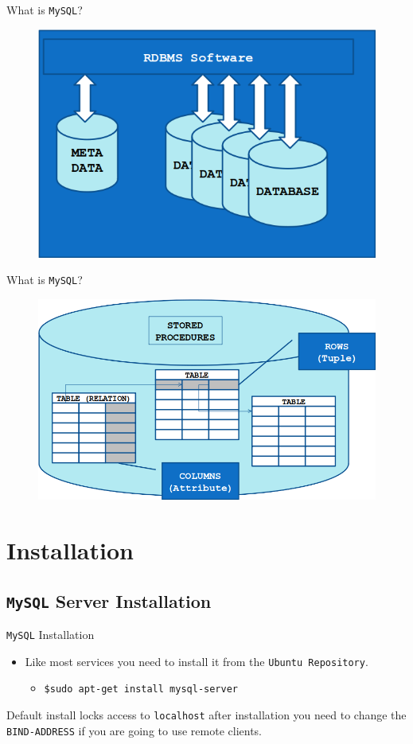 \documentclass[xcolor=table,aspectratio=169]{beamer}
\begin{document}
\begin{frame}{What is \texttt{MySQL}?}
  \begin{figure}
    \begin{center}
      \includegraphics[width=0.6\linewidth]{What.png}
    \end{center}
  \end{figure}
\end{frame}

\begin{frame}{What is \texttt{MySQL}?}
  \begin{figure}
    \begin{center}
      \includegraphics[width=0.6\linewidth]{What2.png}
    \end{center}
  \end{figure}
\end{frame}

\section{Installation}
\subsection{\texttt{MySQL} Server Installation}
\begin{frame}{\texttt{MySQL} Installation}
  \begin{itemize}
    \item Like most services you need to install it from the \texttt{Ubuntu Repository}.
      \begin{itemize}
        \item \texttt{\$sudo apt-get install mysql-server}
      \end{itemize}
  \end{itemize}
  \begin{tcolorbox}
    \begin{center}
      \scriptsize Default install locks access to \texttt{localhost} after installation you need to change the \texttt{BIND-ADDRESS} if you are going to use remote clients.
    \end{center}
  \end{tcolorbox}
\end{frame}
\end{document}
